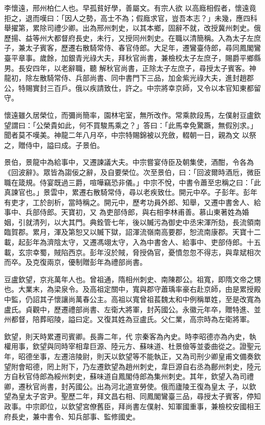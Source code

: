 \begin{pinyinscope}
 李懷遠，邢州柏仁人也。早孤貧好學，善屬文。有宗人欲
 以高廕相假者，懷遠竟拒之，退而嘆曰：「因人之勢，高士不為；假廕求官，豈吾本志？」未幾，應四科舉擢第，累除司禮少卿。出為邢州刺史，以其本鄉，固辭不就，改授冀州刺史。俄歷揚、益等州大都督府長史，未行，又授同州刺史。在職以清簡稱。入為太子左庶子，兼太子賓客，歷遷右散騎常侍、春官侍郎。大足年，遷鸞臺侍郎，尋同鳳閣鸞臺平章事。歲餘，加銀青光祿大夫，拜秋官尚書，兼檢校太子左庶子，賜爵平鄉縣男。長安四年，以老辭職，聽
 解秋官尚書，正除太子左庶子，尋授太子賓客。神龍初，除左散騎常侍、兵部尚書、同中書門下三品，加金紫光祿大夫，進封趙郡公，特賜實封三百戶。俄以疾請致仕，許之。中宗將幸京師，又令以本官知東都留守。



 懷遠雖久居榮位，而彌尚簡率，園林宅室，無所改作。常乘款段馬，左僕射豆盧欽望謂曰：「公榮貴如此，何不買駿馬乘之？」答曰：「此馬幸免驚蹶，無假別求。」聞者莫不嘆美。神龍二年八月卒，中宗特賜錦被以充斂，輟朝一日，親為文
 以祭之，贈侍中，謚曰成。子景伯。



 景伯，景龍中為給事中，又遷諫議大夫。中宗嘗宴侍臣及朝集使，酒酣，令各為《回波辭》。眾皆為謅佞之辭，及自要榮位。次至景伯，曰：「回波爾時酒卮，微臣職在箴規。侍宴既過三爵，喧嘩竊恐非儀。」中宗不悅，中書令蕭至忠稱之曰：「此真諫官也。」景雲中，累遷右散騎常侍，尋以老疾致仕。開元中卒。子彭年。彭年有吏才，工於剖析，當時稱之。開元中，歷考功員外郎、知舉，又遷中書舍人、給事中、兵部侍郎。天寶初，又
 為吏部侍郎，與右相李林甫善。慕山東著姓為婚姻，引就清列，以大其門。典銓管七年，後以贓污為御史中丞宋渾所劾，長流領南臨賀郡。累月，渾及第恕又以贓下獄，詔渾流嶺南高要郡，恕流南康郡。天寶十二載，起彭年為濟陰太守，又遷馮翊太守，入為中書舍人、給事中、吏部侍郎。十五載，玄宗幸蜀，賊陷西京。彭年沒於賊，脅授偽官，憂憤忽忽不得志，與韋斌相次而卒。及克復兩京，優制贈彭年為禮部尚書。



 豆盧欽望，京兆萬年人也。曾祖通，隋相州刺史、南陳郡公。祖寬，即隋文帝之甥也。大業末，為梁泉令。及高祖定關中，寬與郡守蕭瑀率豪右赴京師，由是累授殿中監，仍詔其子懷讓尚萬春公主。高祖以寬曾祖萇魏太和中例稱單姓，至是改寬為盧氏。貞觀中，歷遷禮部尚書、左衛大將軍，封芮國公。永徽元年卒，贈特進、並州都督，陪葬昭陵，謚曰定。又復其姓為豆盧氏。父仁業，高宗時為左衛將軍。



 欽望，則天時累遷司賓卿。長壽二年，代
 宗秦客為內史。時李昭德亦為內史，執權用事，欽望與同時宰相韋巨源、陸元方、蘇味道、杜景儉等並委曲從之。證聖元年，昭德坐事，左遷涪陵尉，則天以欽望等不能執正，又為司刑少卿皇甫文備奏欽望附會昭德，罔上附下，乃左遷欽望為趙州刺史，韋巨源自右丞為鄜州刺史，陸元方自秋官侍郎為綏州刺史，蘇味道自鳳閣侍郎為集州刺史。其年，欽望入為司禮卿，遷秋官尚書，封芮國公。出為河北道宣勞使。俄而廬陵王復為皇太
 子，以欽望為皇太子宮尹。聖歷二年，拜文昌右相、同鳳閣鸞臺三品，尋授太子賓客，停知政事。中宗即位，以欽望宮僚舊臣，拜尚書左僕射、知軍國重事，兼檢校安國相王府長史，兼中書令、知兵部事、監修國史。




\end{pinyinscope}
